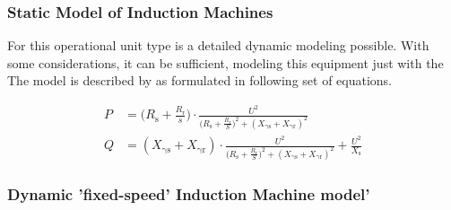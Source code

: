 \subsubsection{Static Model of Induction Machines}

For this operational unit type is a detailed dynamic modeling possible. With some considerations, it can be sufficient, modeling this equipment just with the  The model is described by \textcite{IEEEGuideLoad2022} as formulated in following set of equations. %

\begin{align}
        P&=\Bigg( R_\mathrm{s} + \frac{R_\mathrm{r}}{s} \Bigg) \cdot \frac{U^2}{\Big( R_\mathrm{s} + \frac{R_\mathrm{r}}{S} \Big)^2 + (X_\mathrm{\gamma s} + X_\mathrm{\gamma r})^2} \\[12pt]
        Q&=(X_\mathrm{\gamma s} + X_\mathrm{\gamma r}) \cdot \frac{U^2}{\Big( R_\mathrm{s} + \frac{R_\mathrm{r}}{S} \Big)^2 + (X_\mathrm{\gamma s} + X_\mathrm{\gamma r})^2} + \frac{U^2}{X_\mathrm{s}}
\end{align}


\subsubsection{Dynamic 'fixed-speed' Induction Machine model'}

